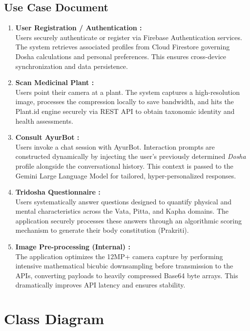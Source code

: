 \subsection{Use Case Document}
\begin{enumerate}
    \item \textbf{ User Registration / Authentication : }\\
    Users securely authenticate or register via Firebase Authentication services. The system retrieves associated profiles from Cloud Firestore governing Dosha calculations and personal preferences. This ensures cross-device synchronization and data persistence.

    \item \textbf{ Scan Medicinal Plant : } \\
    Users point their camera at a plant. The system captures a high-resolution image, processes the compression locally to save bandwidth, and hits the Plant.id engine securely via REST API to obtain taxonomic identity and health assessments.

    \item \textbf{ Consult AyurBot : } \\
    Users invoke a chat session with AyurBot. Interaction prompts are constructed dynamically by injecting the user's previously determined \textit{Dosha} profile alongside the conversational history. This context is passed to the Gemini Large Language Model for tailored, hyper-personalized responses.

     \item \textbf{ Tridosha Questionnaire :}\\
      Users systematically answer questions designed to quantify physical and mental characteristics across the Vata, Pitta, and Kapha domains. The application securely processes these answers through an algorithmic scoring mechanism to generate their body constitution (Prakriti).

   \item \textbf{ Image Pre-processing (Internal) :}\\
    The application optimizes the 12MP+ camera capture by performing intensive mathematical bicubic downsampling before transmission to the APIs, converting payloads to heavily compressed Base64 byte arrays. This dramatically improves API latency and ensures stability.
\end{enumerate}


\newpage
\section{Class Diagram}

